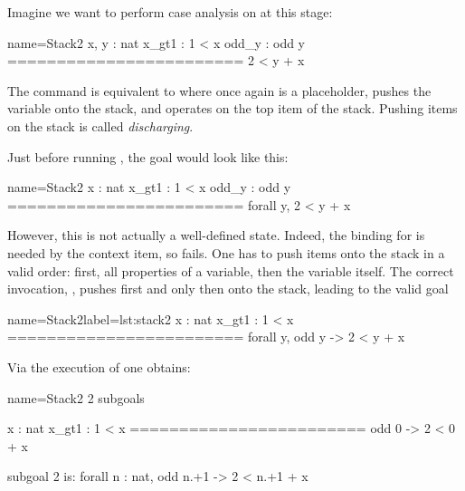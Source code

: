 
Imagine we want to perform case analysis on  at this stage:

\begin{coqout}{name=Stack2}{}
 x, y : nat
 x_gt1 : 1 < x
 odd_y : odd y
 ========================
 2 < y + x
\end{coqout}

The command  is equivalent to
 where  once again is a placeholder,
 pushes the  variable onto the stack, and 
operates on the top item of the stack.
Pushing items on the stack is called \emph{discharging}.

Just before running , the goal would look like this:

\begin{coqout}{name=Stack2}{}
 x : nat
 x_gt1 : 1 < x
 odd_y : odd y
 ========================
 forall y, 2 < y + x
\end{coqout}

However, this is not actually a well-defined state.
Indeed, the binding for  is needed by the 
context item, so  fails.  One has to push items onto the
stack in a valid order: first, all properties of a variable, then the
variable itself.  The correct invocation,
, pushes first  and only then  onto
the stack, leading to the valid goal

\begin{coqout}{name=Stack2}{label=lst:stack2}
 x : nat
 x_gt1 : 1 < x
 ========================
 forall y, odd y -> 2 < y + x
\end{coqout}

Via the execution of  one obtains:

\begin{coqout}{name=Stack2}{}
2 subgoals

  x : nat
  x_gt1 : 1 < x
  ========================
   odd 0 -> 2 < 0 + x

subgoal 2 is:
 forall n : nat, odd n.+1 -> 2 < n.+1 + x
\end{coqout}

